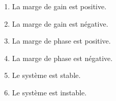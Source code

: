 \documentclass[10pt,fleqn]{article} %
\begin{document}
\begin{multicols}{2}
\begin{enumerate}
\begin{center}
\end{center}
\begin{enumerate}
\item La marge de gain est positive.
\item La marge de gain est négative.
\item La marge de phase est positive.
\item La marge de phase est négative.
\item Le système est stable.
\item Le système est instable.
\end{enumerate}
\end{enumerate}
\end{multicols}
\end{document}

